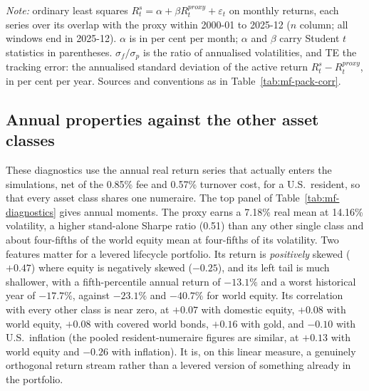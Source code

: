 \documentclass[11pt]{article}
\begin{document}
\begin{table}[H]
\centering
\caption{Regressions of managed-futures benchmarks and investable funds on
the net proxy}
\label{tab:mf-pack-reg}
\footnotesize

\begin{minipage}{0.86\textwidth}\footnotesize
\textit{Note:} ordinary least squares $R^{s}_t = \alpha + \beta
R^{proxy}_t + \varepsilon_t$ on monthly returns, each series over its
overlap with the proxy within 2000-01 to 2025-12 ($n$ column; all windows end
in 2025-12). $\alpha$ is
in per cent per month; $\alpha$ and $\beta$ carry Student $t$ statistics in
parentheses. $\sigma_f/\sigma_p$ is the ratio of annualised volatilities, and
TE the tracking error: the annualised standard deviation of the active return
$R^{s}_t - R^{proxy}_t$, in per cent per year. Sources and conventions as
in Table~\ref{tab:mf-pack-corr}.
\end{minipage}
\end{table}

\subsection{Annual properties against the other asset classes}
\label{app:mf-annual}

These diagnostics use the annual real return series that actually enters the
simulations, net of the 0.85\% fee and 0.57\% turnover cost, for a U.S.\
resident, so that every asset class shares one numeraire. The top panel of
Table~\ref{tab:mf-diagnostics} gives annual moments. The proxy earns a 7.18\%
real mean at 14.16\% volatility, a higher stand-alone Sharpe ratio (0.51) than
any other single class and about four-fifths of the world equity mean at
four-fifths of its volatility. Two features matter for a levered
lifecycle portfolio. Its return is \emph{positively} skewed ($+0.47$) where
equity is negatively skewed ($-0.25$), and its left tail is much shallower, with
a fifth-percentile annual return of $-13.1\%$ and a worst historical year of
$-17.7\%$, against $-23.1\%$ and $-40.7\%$ for world equity. Its correlation
with every other class is near zero, at $+0.07$ with domestic equity, $+0.08$
with world equity, $+0.08$ with covered world bonds, $+0.16$ with gold, and
$-0.10$ with U.S.\ inflation (the pooled resident-numeraire figures are similar,
at $+0.13$ with world equity and $-0.26$ with inflation). It is, on this linear
measure, a genuinely orthogonal return stream rather than a levered version of
something already in the portfolio.
\end{document}
